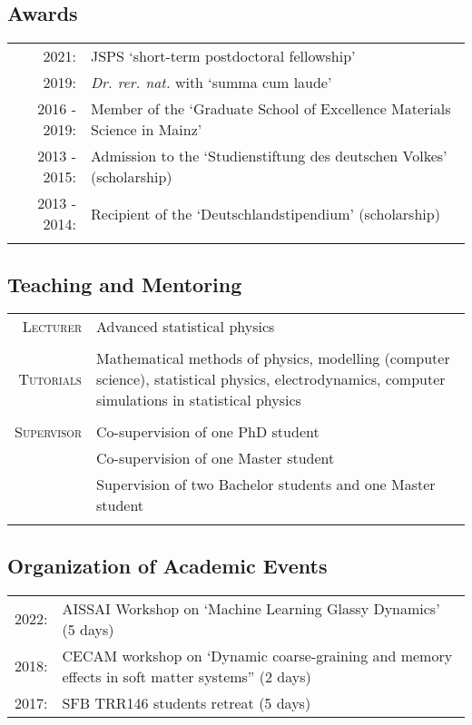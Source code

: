 \subsection*{Awards}
\begin{tabular}{rp{14cm}}
	\textsc{2021:}& JSPS `short-term postdoctoral fellowship'\\
		\textsc{2019:}& \emph{Dr. rer. nat.} with `summa cum laude'\\
\textsc{2016 - 2019:}& {Member of the ‘Graduate School of Excellence Materials Science in Mainz’
 } \\

 \textsc{2013 - 2015:} & {Admission to the ‘Studienstiftung des deutschen Volkes’ (scholarship)} \\

\textsc{2013 - 2014:}& {Recipient of the ‘Deutschlandstipendium’ (scholarship)
}
\\\multicolumn{2}{c}{}\\
	
\end{tabular}

\subsection*{Teaching and Mentoring}
\begin{tabular}{r|p{13cm}}
	\textsc{Lecturer}& {Advanced statistical physics
	} 
	\\\multicolumn{2}{c}{}\\
	\textsc{Tutorials}& Mathematical methods of physics, modelling (computer science), statistical
	physics, electrodynamics, computer simulations in statistical physics
	\\\multicolumn{2}{c}{}\\
	
	\textsc{Supervisor}& {Co-supervision of one PhD student}\\
	& {Co-supervision of one Master student}\\
	& {Supervision of two Bachelor students and one Master student}
	\\\multicolumn{2}{c}{}\\	
\end{tabular}

\subsection*{Organization of Academic Events}

	\begin{tabular}{rl}
			2022: & {AISSAI} Workshop on `Machine Learning Glassy Dynamics'  (5 days)\\
			2018: & CECAM workshop on ‘Dynamic coarse-graining and memory effects in soft matter systems” (2 days)\\
	2017: & SFB TRR146 students retreat (5 days)
	 
\end{tabular}


